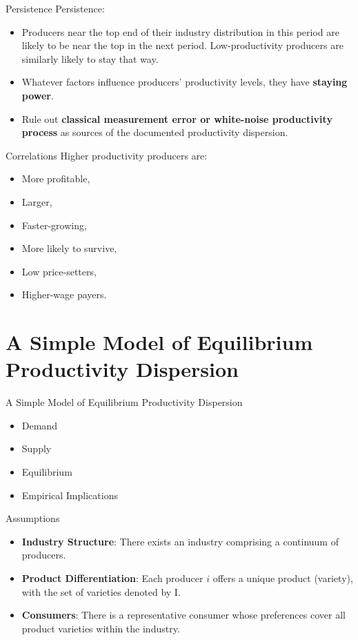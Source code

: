 \documentclass[aspectratio=169]{beamer}  %
\begin{document}
\begin{frame}{Persistence}
    Persistence:
    \begin{itemize}
        \item Producers near the top end of their industry distribution in this period are likely to be near the top in the next period.
        Low-productivity producers are similarly likely to stay that way.
        \item Whatever factors influence producers' productivity levels, they have \textbf{staying power}.
        \item Rule out \textbf{classical measurement error or white-noise productivity process} as sources of the documented productivity dispersion.
    \end{itemize}
\end{frame}

\begin{frame}{Correlations}
    Higher productivity producers are:
    \begin{itemize}
        \item More profitable,
        \item Larger,
        \item Faster-growing,
        \item More likely to survive,
        \item Low price-setters,
        \item Higher-wage payers.
    \end{itemize}
\end{frame}

\section{A Simple Model of Equilibrium Productivity Dispersion}
\begin{frame}{A Simple Model of Equilibrium Productivity Dispersion}
    \begin{itemize}
        \item Demand
        \item Supply
        \item Equilibrium
        \item Empirical Implications
    \end{itemize}
\end{frame}

\begin{frame}{Assumptions}
    \begin{itemize}
        \item \textbf{Industry Structure}: There exists an industry comprising a continuum of producers.
        \item \textbf{Product Differentiation}: Each producer \(i\) offers a unique product (variety), with the set of varieties denoted by \(\mathrm{I}\).
        \item \textbf{Consumers}: There is a representative consumer whose preferences cover all product varieties within the industry.
    \end{itemize}
\end{frame}
\end{document}
